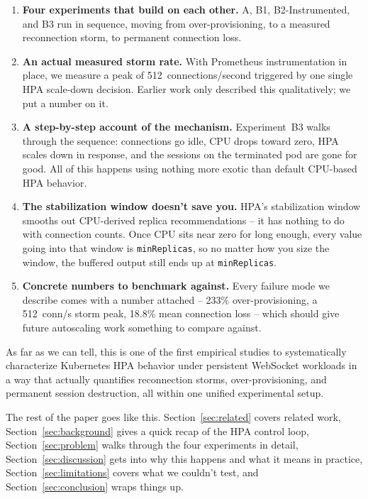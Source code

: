 \documentclass[pdflatex,sn-mathphys-num]{sn-jnl}
\theoremstyle{thmstyleone}%
\theoremstyle{thmstyletwo}%
\theoremstyle{thmstylethree}%
\begin{document}
\begin{enumerate}[leftmargin=*]
\item \textbf{Four experiments that build on each other.} A, B1, B2-Instrumented,
  and B3 run in sequence, moving from over-provisioning, to a measured reconnection
  storm, to permanent connection loss.

\item \textbf{An actual measured storm rate.} With Prometheus instrumentation in
  place, we measure a peak of 512~connections/second triggered by one single HPA
  scale-down decision. Earlier work only described this qualitatively; we put a
  number on it.

\item \textbf{A step-by-step account of the mechanism.} Experiment~B3 walks
  through the sequence: connections go idle, CPU drops toward zero, HPA scales
  down in response, and the sessions on the terminated pod are gone for good. All of
  this happens using nothing more exotic than default CPU-based HPA behavior.

\item \textbf{The stabilization window doesn't save you.} HPA's stabilization
  window smooths out CPU-derived replica recommendations -- it has nothing to do
  with connection counts. Once CPU sits near zero for long enough, every value
  going into that window is \texttt{minReplicas}, so no matter how you size the
  window, the buffered output still ends up at \texttt{minReplicas}.

\item \textbf{Concrete numbers to benchmark against.} Every failure mode we
  describe comes with a number attached -- 233\% over-provisioning, a 512~conn/s
  storm peak, 18.8\% mean connection loss -- which should give future autoscaling
  work something to compare against.
\end{enumerate}

As far as we can tell, this is one of the first empirical studies to systematically
characterize Kubernetes HPA behavior under persistent WebSocket workloads in a way
that actually quantifies reconnection storms, over-provisioning, and permanent
session destruction, all within one unified experimental setup.

The rest of the paper goes like this. Section~\ref{sec:related} covers related
work, Section~\ref{sec:background} gives a quick recap of the HPA control loop,
Section~\ref{sec:problem} walks through the four experiments in detail,
Section~\ref{sec:discussion} gets into why this happens and what it means in
practice, Section~\ref{sec:limitations} covers what we couldn't test, and
Section~\ref{sec:conclusion} wraps things up.
\end{document}
